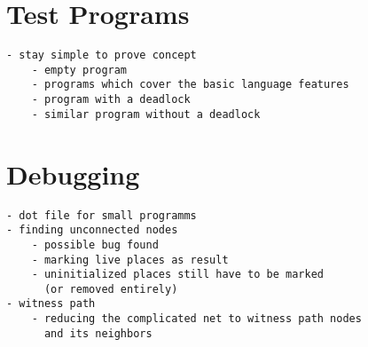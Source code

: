 \section{Test Programs}
\label{app_test}
\begin{verbatim}
- stay simple to prove concept
    - empty program
    - programs which cover the basic language features
    - program with a deadlock
    - similar program without a deadlock
\end{verbatim}

\section{Debugging}
\label{app_debug}
\begin{verbatim}
- dot file for small programms
- finding unconnected nodes
    - possible bug found
    - marking live places as result
    - uninitialized places still have to be marked
      (or removed entirely)
- witness path
    - reducing the complicated net to witness path nodes 
      and its neighbors
\end{verbatim}